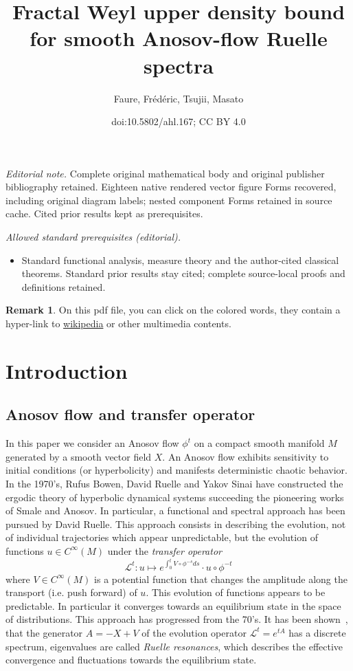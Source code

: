 \documentclass[10pt]{amsart}
\title{Fractal Weyl upper density bound for smooth Anosov-flow Ruelle spectra}
\author{Faure, Frédéric, Tsujii, Masato}
\date{doi:10.5802/ahl.167; CC BY 4.0}
\theoremstyle{definition}\newtheorem{defi}[theo]{Definition}\newtheorem{rema}[theo]{Remark}\newtheorem{exam}[theo]{Example}\newtheorem{exem}[theo]{Example}\newtheorem{nota}[theo]{Notation}
\newcommand{\clL}{\mathcal{L}}
\begin{document}
\maketitle
\noindent\textit{Editorial note.} Complete original mathematical body and original publisher bibliography retained. Eighteen native rendered vector figure Forms recovered, including original diagram labels; nested component Forms retained in source cache. Cited prior results kept as prerequisites.\par\medskip
\noindent\textit{Allowed standard prerequisites (editorial).}\begin{itemize}
\item Standard functional analysis, measure theory and the author-cited classical theorems. Standard prior results stay cited; complete source-local proofs and definitions retained.
\end{itemize}\medskip
\setcounter{tocdepth}{2}
\tableofcontents{}

\begin{rema}
On this pdf file, you can click on the colored words, they contain a hyper-link to \href{https://en.wikipedia.org/wiki/Main_Page}{wikipedia} or other multimedia contents.
\end{rema}



\section{Introduction}

\subsection*{Anosov flow and transfer operator}

In this paper we consider an Anosov flow $\phi^{t}$ on a compact smooth manifold $M$ generated by a smooth vector field $X$. An Anosov flow exhibits sensitivity to initial conditions (or hyperbolicity) and manifests deterministic chaotic behavior. In the 1970's, Rufus Bowen, David Ruelle and Yakov Sinai have constructed the ergodic theory of hyperbolic dynamical systems succeeding the pioneering works of Smale and Anosov. In particular, a functional and spectral approach has been pursued by David Ruelle. This approach consists in describing the evolution, not of individual trajectories which appear unpredictable, but the evolution of functions $u\in C^{\infty}(M)$ under the \emph{transfer operator}
\[
\clL^{t}:u\mapsto e^{\int_{0}^{t}V\circ\phi^{-s}ds}\cdot u\circ\phi^{-t}
\]
where $V\in C^{\infty}(M)$ is a potential function that changes the amplitude along the transport (i.e. push forward) of $u$. This evolution of functions appears to be predictable. In particular it converges towards an equilibrium state in the space of distributions. This approach has progressed from the 70's. It has been shown~\cite{Baladi05,liverani_02,liverani_butterley_07,baladi_05,dyatlov_guillarmou_2014,fred-RP-06,fred-roy-sjostrand-07,fred_flow_09,liverani_04}, that the generator $A=-X+V$ of the evolution operator $\clL^{t}=e^{tA}$ has a discrete spectrum, eigenvalues are called\emph{ Ruelle resonances}, which describes the effective convergence and fluctuations towards the equilibrium state.
\end{document}
